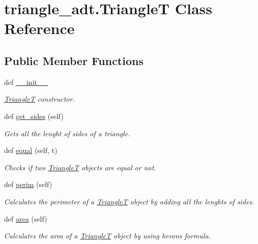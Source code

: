 \hypertarget{classtriangle__adt_1_1_triangle_t}{}\section{triangle\+\_\+adt.\+TriangleT Class Reference}
\label{classtriangle__adt_1_1_triangle_t}
\subsection*{Public Member Functions}
\begin{DoxyCompactItemize}
\item 
def \hyperlink{classtriangle__adt_1_1_triangle_t_a9837232c07fac634ba677a44fc3fee96}{\+\_\+\+\_\+init\+\_\+\+\_\+}
\begin{DoxyCompactList}\small\item\em \hyperlink{classtriangle__adt_1_1_triangle_t}{TriangleT} constructor. \end{DoxyCompactList}\item 
def \hyperlink{classtriangle__adt_1_1_triangle_t_a598e20e41e186231c9103a6249f9eeb6}{get\+\_\+sides} (self)
\begin{DoxyCompactList}\small\item\em Gets all the lenght of sides of a triangle. \end{DoxyCompactList}\item 
def \hyperlink{classtriangle__adt_1_1_triangle_t_aa7615cb08eac693134dd4022d984c8ec}{equal} (self, t)
\begin{DoxyCompactList}\small\item\em Checks if two \hyperlink{classtriangle__adt_1_1_triangle_t}{TriangleT} objects are equal or not. \end{DoxyCompactList}\item 
def \hyperlink{classtriangle__adt_1_1_triangle_t_aeb7d763a098e7d8d23b78c69d375154c}{perim} (self)
\begin{DoxyCompactList}\small\item\em Calculates the perimeter of a \hyperlink{classtriangle__adt_1_1_triangle_t}{TriangleT} object by adding all the lenghts of sides. \end{DoxyCompactList}\item 
def \hyperlink{classtriangle__adt_1_1_triangle_t_a61a982c7a989dc80764cbf7c79ec048b}{area} (self)
\begin{DoxyCompactList}\small\item\em Calculates the area of a \hyperlink{classtriangle__adt_1_1_triangle_t}{TriangleT} object by using herons formula. \end{DoxyCompactList}\item 

\end{DoxyCompactItemize}
